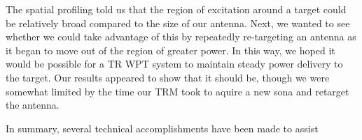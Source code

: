 The spatial profiling told us that the region of excitation around a target could be relatively broad compared to the size of our antenna. Next, we wanted to see whether we could take advantage of this by repeatedly re-targeting an antenna as it began to move out of the region of greater power. In this way, we hoped it would be possible for a TR WPT system to maintain steady power delivery to the target. Our results appeared to show that it should be, though we were somewhat limited by the time our TRM took to aquire a new sona and retarget the antenna.

In summary, several technical accomplishments have been made to assist
